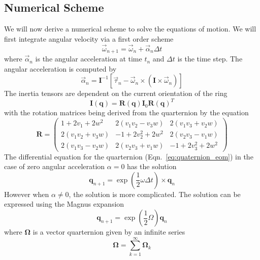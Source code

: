 \subsection{Numerical Scheme}
We will now derive a numerical scheme to solve the equations of motion. We will first integrate angular velocity via a first
order scheme
\begin{equation}
    \vec{\omega}_{n+1} = \vec{\omega}_n + \vec{\alpha}_n \Delta t
\end{equation}
where \( \vec{\alpha}_n \) is the angular acceleration at time \( t_n \) and \( \Delta t \) is the time step.
The angular acceleration is computed by
\begin{equation}
    \vec{\alpha}_n = {\mathbf{I}}^{-1} \left[\vec{\tau}_n - \vec{\omega}_n \times \left(\mathbf{I} \times \vec{\omega}_n\right)\right]
\end{equation}
The inertia tensors are dependent on the current orientation of the ring
\begin{equation}
    \mathbf{I}(\mathbf{q}) = \mathbf{R}(\mathbf{q}) \mathbf{I}_0 {\mathbf{R}(\mathbf{q})}^T
\end{equation}
with the rotation matrices being derived from the quarternion by the equation
\begin{equation}
    \mathbf{R} = \begin{pmatrix}
        1 + 2v_{1} + 2w^2      & 2(v_{1}v_{2} - v_{3}w) & 2(v_{1}v_{3} + v_{2}w) \\
        2(v_{1}v_{2} + v_{3}w) & -1 + 2v_{2}^2 + 2w^2   & 2(v_{2}v_{3} - v_{1}w) \\
        2(v_{1}v_{3} - v_{2}w) & 2(v_{2}v_{3} + v_{1}w) & -1 + 2v_{3}^2 + 2w^2
    \end{pmatrix}
\end{equation}
The differential equation for the quarternion (Eqn.~\ref{eq:quaternion_eom}) in the case of zero angular acceleration \( \alpha = 0 \)
has the solution
\begin{equation}
    \mathbf{q}_{n+1} = \exp\left(\frac{1}{2}\omega\Delta t\right) \times \mathbf{q}_n
\end{equation}
However when \( \alpha \neq 0 \), the solution is more complicated. The solution can be expressed using the Magnus expansion
\begin{equation}
    \mathbf{q}_{n+1} = \exp\left(\frac{1}{2}\Omega\right) \mathbf{q}_{n}
\end{equation}
where \( \mathbf{\Omega} \) is a vector quarternion given by an infinite series
\begin{equation}
    \mathbf{\Omega} = \sum_{k=1}^{\infty} \mathbf{\Omega}_k
\end{equation}
